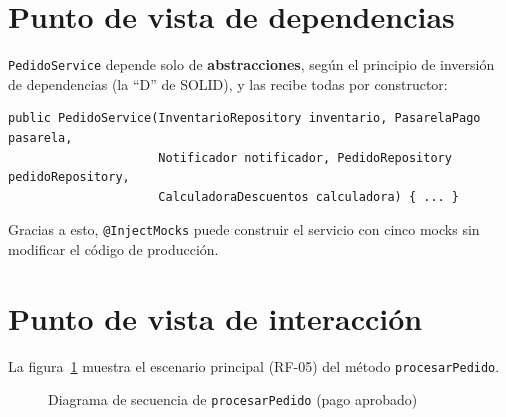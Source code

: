 \documentclass[11pt,a4paper,oneside]{report}
\newcommand{\code}[1]{\texttt{#1}}
\begin{document}
\section{Punto de vista de dependencias}
\code{PedidoService} depende solo de \textbf{abstracciones}, según el principio de inversión de dependencias (la ``D'' de SOLID), y las recibe todas por constructor:
\begin{lstlisting}[caption={Inyección por constructor en \code{PedidoService}}]
public PedidoService(InventarioRepository inventario, PasarelaPago pasarela,
                     Notificador notificador, PedidoRepository pedidoRepository,
                     CalculadoraDescuentos calculadora) { ... }
\end{lstlisting}
Gracias a esto, \code{@InjectMocks} puede construir el servicio con cinco mocks sin modificar el código de producción.

\section{Punto de vista de interacción}
La figura~\ref{fig:secuencia} muestra el escenario principal (RF-05) del método \code{procesarPedido}.

\begin{figure}[H]
\centering
{}
\caption{Diagrama de secuencia de \code{procesarPedido} (pago aprobado)}
\label{fig:secuencia}
\end{figure}
\end{document}
